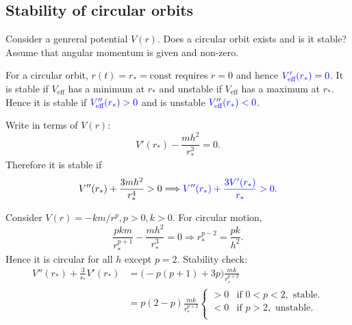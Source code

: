 \subsection{Stability of circular orbits}
Consider a genreral potential $V(r)$. Does a circular orbit exists and is it stable? Assume that angular momentum is given and non-zero.

For a circular orbit, $r(t)=r_*=\text{const}$ requires $ \ddot{r}=0 $ and hence $ {\color{blue}V_{\text{eff}}'(r_*)=0} $. It is stable if $ V_{\text{eff}} $ has a minimum at $r_*$ and unstable if $V_{\text{eff}}$ has a maximum at $r_*$. Hence it is stable if $ {\color{blue}V_{\text{eff}}''(r_*)>0} $ and is unstable $ {\color{blue}V_{\text{eff}}''(r_*)<0} $. 

Write in terms of $V(r)$: 
\[
    V'(r_*)-\frac{mh^2}{r_*^3}=0.
\]
Therefore it is stable if
\[
    V''(r_*)+\frac{3mh^2}{r_*^4}>0 \Longrightarrow {\color{blue}V''(r_*)+\frac{3V'(r_*)}{r_*}>0}.
\]

\begin{example}
    Consider $ V(r)=-km/r^p,p>0,k>0 $. For circular motion,
    \[
        \frac{pkm}{r_*^{p+1}}-\frac{mh^2}{r_*^3}=0 \Longrightarrow r_*^{p-2}=\frac{pk}{h^2}.
    \]
    Hence it is circular for all $h$ except $p=2$. Stability check:
    \begin{align*}
        V''(r_*) + \frac{3}{r_*}V'(r_*) &= \big( -p(p + 1) + 3p\big)\frac{mk}{r_*^{p + 2}}\\
        &= p(2-p)\frac{mk}{r_*^{p + 2}} \begin{cases}
            >0 &\text{if }0<p<2,\text{ stable}.\\
            <0 &\text{if }p>2,\text{ unstable}.\\
            \end{cases} 
    \end{align*}
    \begin{center}
    \end{center}
\end{example}

